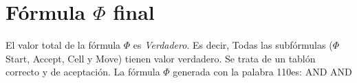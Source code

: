 ﻿\documentclass[a4paper,10pt]{article}
\begin{document}
\section{Fórmula $\Phi$ final}
El valor total de la fórmula $\Phi$ es \emph{Verdadero}. Es decir, Todas las subfórmulas ($\Phi$ Start, Accept, Cell y Move) tienen valor verdadero.
Se trata de un tablón correcto y de aceptación. \newline \newline 
La fórmula $\Phi$ generada con la palabra 110es: \newline {}\newline \newline 
AND \newline {}\newline \newline 
AND \newline \newline 
\end{document}
